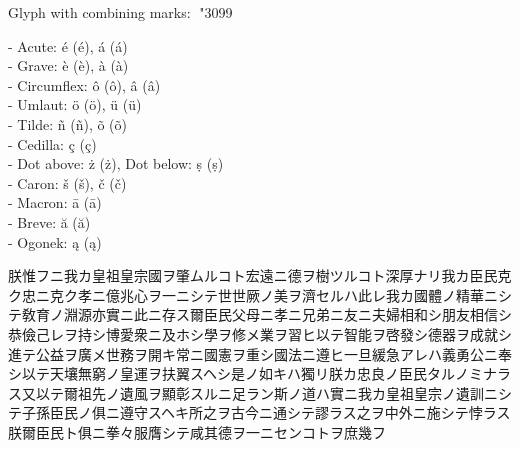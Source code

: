 \documentclass[a5paper, 10pt, openany]{book} %
\begin{document}
Glyph with combining marks: \char"3099\







- Acute: \'e (é), \'a (á) \\
- Grave: \`e (è), \`a (à) \\
- Circumflex: \^o (ô), \^a (â) \\
- Umlaut: \"o (ö), \"u (ü) \\
- Tilde: \~n (ñ), \~o (õ) \\
- Cedilla: \c{c} (ç) \\
- Dot above: \.{z} (ż), Dot below: \d{s} (ṣ) \\
- Caron: \v{s} (š), \v{c} (č) \\
- Macron: \={a} (ā) \\
- Breve: \u{a} (ă) \\
- Ogonek: \k{a} (ą)


 
朕惟フニ我カ皇祖皇宗國ヲ肇ムルコト宏遠ニ德ヲ樹ツルコト深厚ナリ我カ臣民克ク忠ニ克ク孝ニ億兆心ヲ一ニシテ世世厥ノ美ヲ濟セルハ此レ我カ國體ノ精華ニシテ敎育ノ淵源亦實ニ此ニ存ス爾臣民父母ニ孝ニ兄弟ニ友ニ夫婦相和シ朋友相信シ恭儉己レヲ持シ博愛衆ニ及ホシ學ヲ修メ業ヲ習ヒ以テ智能ヲ啓發シ德器ヲ成就シ進テ公益ヲ廣メ世務ヲ開キ常ニ國憲ヲ重シ國法ニ遵ヒ一旦緩急アレハ義勇公ニ奉シ以テ天壤無窮ノ皇運ヲ扶翼スヘシ是ノ如キハ獨リ朕カ忠良ノ臣民タルノミナラス又以テ爾祖先ノ遺風ヲ顯彰スルニ足ラン斯ノ道ハ實ニ我カ皇祖皇宗ノ遺訓ニシテ子孫臣民ノ俱ニ遵守スヘキ所之ヲ古今ニ通シテ謬ラス之ヲ中外ニ施シテ悖ラス朕爾臣民ト俱ニ拳々服膺シテ咸其德ヲ一ニセンコトヲ庶幾フ

  󱍑  󰼐󱑡  󱍑  󰼐󱑡  󱍑  󰼐󱑡  󱍑  󰼐󱑡  󱍑  󰼐󱑡  󱍑  󰼐󱑡  󱍑  󰼐󱑡  󱍑  󰼐󱑡  󱍑  󰼐󱑡  󱍑  󰼐󱑡  󱍑  󰼐󱑡  󱍑  󰼐󱑡
  󱍑  󰼐󱑡  󱍑  󰼐󱑡  󱍑  󰼐󱑡  󱍑  󰼐󱑡  󱍑  󰼐󱑡  󱍑  󰼐󱑡  󱍑  󰼐󱑡  󱍑  󰼐󱑡  󱍑  󰼐󱑡  󱍑  󰼐󱑡  󱍑  󰼐󱑡  󱍑  󰼐󱑡
  󱍑  󰼐󱑡  󱍑  󰼐󱑡  󱍑  󰼐󱑡  󱍑  󰼐󱑡  󱍑  󰼐󱑡  󱍑  󰼐󱑡  󱍑  󰼐󱑡  󱍑  󰼐󱑡  󱍑  󰼐󱑡  󱍑  󰼐󱑡  󱍑  󰼐󱑡  󱍑  󰼐󱑡
  󱍑  󰼐󱑡  󱍑  󰼐󱑡  󱍑  󰼐󱑡  󱍑  󰼐󱑡  󱍑  󰼐󱑡  󱍑  󰼐󱑡  󱍑  󰼐󱑡  󱍑  󰼐󱑡  󱍑  󰼐󱑡  󱍑  󰼐󱑡  󱍑  󰼐󱑡  󱍑  󰼐󱑡
  󱍑  󰼐󱑡  󱍑  󰼐󱑡  󱍑  󰼐󱑡  󱍑  󰼐󱑡  󱍑  󰼐󱑡  󱍑  󰼐󱑡  󱍑  󰼐󱑡  󱍑  󰼐󱑡  󱍑  󰼐󱑡  󱍑  󰼐󱑡  󱍑  󰼐󱑡  󱍑  󰼐󱑡\\
\end{document}
